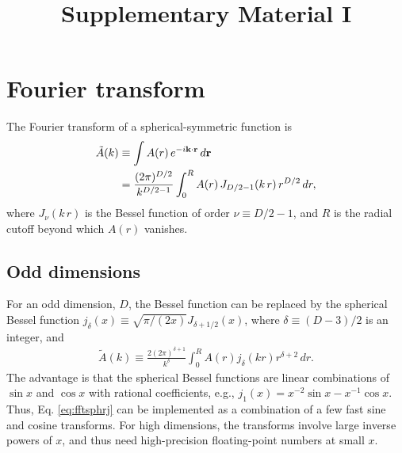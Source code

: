 \documentclass[aip,jcp,preprint,superscriptaddress,showpacs,preprintnumbers,amsmath,amssymb]{revtex4-1}
\numberwithin{equation}{section}
\newcommand{\vct}[1]{\mathbf{#1}}
\providecommand{\vr}{} %
\renewcommand{\vr}{\vct{r}}
\newcommand{\vk}{\vct{k}}
\begin{document}
\title{Supplementary Material I}
\maketitle





\section{Fourier transform}





The Fourier transform of a spherical-symmetric function is
%
%
%
\begin{align}
  \tilde A(k)
&\equiv
  \int A(r) \, e^{-i\vk \cdot \vr} \, d\vr
  \notag \\
&=
  \frac{ (2\pi)^{D/2} }
       { k^{D/2-1} }
  \int_0^R A(r) \, J_{D/2-1}(k \, r) \, r^{D/2} \, dr,
\label{eq:fftsphr}
\end{align}
%
%
%
where $J_\nu(k \, r)$ is the Bessel function
of order $\nu \equiv D/2-1$,
and $R$ is the radial cutoff beyond which $A(r)$ vanishes.





\subsection{Odd dimensions}





For an odd dimension, $D$,
the Bessel function can be replaced
by the spherical Bessel function\cite{arfken}
$j_\delta(x) \equiv \sqrt{\pi/(2x)} J_{\delta + 1/2}(x)$,
where $\delta \equiv (D - 3)/2$ is an integer,
and
%
%
%
\begin{align}
\tilde A(k)
\equiv
\frac{ 2 (2 \pi)^{\delta + 1} }
     { k^\delta }
\int_0^R
A(r) j_\delta(k r) r^{\delta + 2} \, dr.
\label{eq:fftsphrj}
\end{align}
%
%
%
The advantage is that the spherical Bessel functions are
linear combinations of $\sin x$ and $\cos x$
with rational coefficients,
e.g.,
$j_1(x) = x^{-2} \sin x - x^{-1} \cos x$.
%
Thus,
Eq. \eqref{eq:fftsphrj} can be implemented as
a combination of
a few fast sine and cosine transforms\cite{press}.
%
For high dimensions,
the transforms involve large inverse powers of $x$,
and thus need high-precision floating-point numbers
at small $x$.
\end{document}

